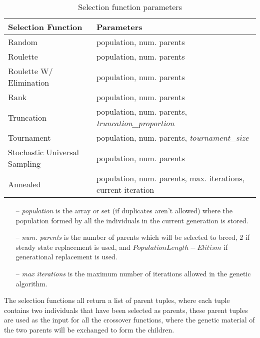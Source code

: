 \begin{table}[H]
\begin{adjustwidth}{-3em}{-3em}
\centering
\begin{tabular}{|l|l|} 
\hline
\rowcolor{Gray}
\textbf{Selection Function}   & \textbf{Parameters}                                                                 \\ 
\hline
Random                        & population, num. parents                                                       \\ 
\hline
Roulette                      & population, num. parents                                                       \\ 
\hline
Roulette W/ Elimination       & population, num. parents                                                       \\ 
\hline
Rank                          & population, num. parents                                                       \\ 
\hline
Truncation                    & population, num. parents, \textit{truncation\_proportion}                                \\ 
\hline
Tournament                    & population, num. parents, \textit{tournament\_size}                                     \\ 
\hline
Stochastic Universal Sampling & population, num. parents                                                       \\ 
\hline
Annealed                      & population, num. parents, max. iterations, current iteration  \\
\hline
\end{tabular}
\caption{ Selection function parameters}
\end{adjustwidth}
\end{table}
\begin{itemize}
\item[--]\textit{population} is the array or set (if duplicates aren't allowed) where the population formed by all the individuals in the current generation is stored.
\item[--]\textit{num. parents} is the number of parents which will be selected to breed, 2 if steady state replacement is used, and $Population Length - Elitism$ if generational replacement is used.
\item[--]\textit{max iterations} is the maximum number of iterations allowed in the genetic algorithm.
\end{itemize}
The selection functions all return a list of parent tuples, where each tuple contains two individuals that have been selected as parents, these parent tuples are used as the input for all the crossover functions, where the genetic material of the two parents will be exchanged to form the children.

